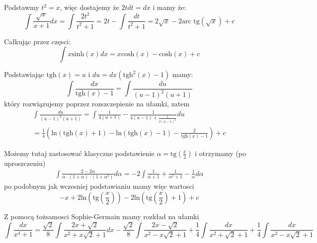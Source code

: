 \documentclass[11pt]{scrartcl}
\begin{document}
        \begin{walk}
            \item Podstawmy $t^2 = x$, więc dostajemy że $2t dt = dx$ i mamy że:
              \[
                \int \frac{\sqrt{x} }{x + 1} dx = \int \frac{2 t^2}{t^2 + 1} = 2t - \int \frac{dt}{t^2 + 1} = 2\sqrt{x} - 2 \text{arc tg} \left ( \sqrt{x}  \right )  + c
              \]
            \item Całkując przez częsci:
              \[
                  \int x \text{sinh} \left ( x \right ) dx = x \text{cosh} \left ( x \right ) - \text{cosh} \left ( x \right ) + c
              \]
            \item Podstawiając $\text{tgh} \left ( x \right ) = u $ i $du = dx (\text{tgh}^2 \left ( x \right ) -1)$ mamy:
              \[
                  \int \frac{dx}{\text{tgh} \left ( x \right ) - 1 } = \int \frac{du}{(u-1)^2 (u+1)}
              \]
              który rozwiązujemy poprzez rozszczepienie na ułamki, zatem
              \begin{gather*}
                  \int \frac{du}{(u-1)^2 (u+1)} = \int \frac{1}{4(u+1)} - \frac{1}{4(u-1) + \frac{1}{2(u-1)^2}}du \\ = \frac{1}{4} \left ( \text{ln} \left ( \text{tgh} \left ( x \right ) + 1  \right ) - \text{ln} \left ( \text{tgh} \left ( x \right ) - 1  \right ) - \frac{2}{\text{tgh} \left ( x \right ) - 1 }  \right ) + c
                \end{gather*}
              \item Możemy tutaj zastosować klasyczne podstawienie $\alpha = \text{tg} \left ( \frac{x}{2} \right ) $ i otrzymamy (po uproszczeniu)
                \begin{gather*}
                  \int \frac{2 - 2 \alpha }{\alpha \cdot (1 + \alpha ) \cdot ( 1 + \alpha^2 )} d \alpha = -2 \int \frac{1}{\alpha + 1} + \frac{1}{\alpha^2 + 1} - \frac{1}{\alpha } d \alpha 
                \end{gather*}
              po podobnym jak wczesniej podstawianiu mamy więc wartosci
              \[
                  -x  + 2 \text{ln} \left ( \text{tg} \left ( \frac{x}{2} \right )  \right ) - 2 \text{ln} \left ( \text{tg} \left ( \frac{x}{2} \right ) + 1  \right ) + c 
              \]
          \item Z pomocą tożsamosci Sophie-Germain mamy rozkład na ułamki
            \[
                \int \frac{dx}{x^4 + 1} = \frac{\sqrt{2} }{8} \int \frac{2x + \sqrt{2} }{x^2 + x \sqrt{2} + 1 } dx - \frac{\sqrt{2} }{8} \int \frac{2x - \sqrt{2} }{x^2 - x \sqrt{2} + 1 } + \frac{1}{4} \int \frac{dx}{x^2 + \sqrt{2} + 1} + \frac{1}{4} \int \frac{dx}{x^2 - x \sqrt{2} + 1 }
\]
\end{walk}
\end{document}

